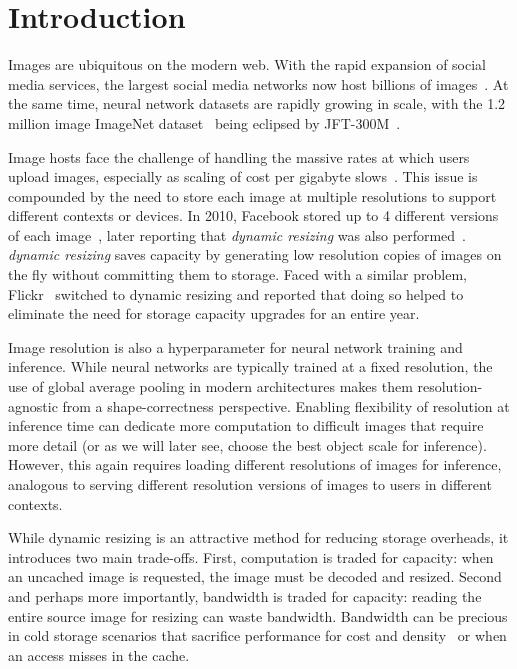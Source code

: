 \section{Introduction}
Images are ubiquitous on the modern web. 
With the rapid expansion of social media services, the largest social media networks now host billions of images~\cite{huang2013analysis}.
At the same time, neural network datasets are rapidly growing in scale, with the 1.2 million image ImageNet dataset~\cite{russakovsky2015imagenet} being eclipsed by JFT-300M~\cite{sun2017revisiting}.

Image hosts face the challenge of handling the massive rates at which users upload images, especially as scaling of cost per gigabyte slows~\cite{gupta-mascots14}. 
This issue is compounded by the need to store each image at multiple resolutions to support different contexts or devices. 
In 2010, Facebook stored up to 4 different versions of each image~\cite{beaver2010finding}, later reporting that \emph{dynamic resizing} was also performed~\cite{huang2013analysis}.
\emph{dynamic resizing} saves capacity by generating low resolution copies of images on the fly without committing them to storage.
Faced with a similar problem, Flickr~\cite{flickr} switched to dynamic resizing and reported that doing so helped to eliminate the need for storage capacity upgrades for an entire year. 

Image resolution is also a hyperparameter for neural network training and inference.
While neural networks are typically trained at a fixed resolution, the use of global average pooling in modern architectures makes them resolution-agnostic from a shape-correctness perspective.
Enabling flexibility of resolution at inference time can dedicate more computation to difficult images that require more detail (or as we will later see, choose the best object scale for inference).
However, this again requires loading different resolutions of images for inference, analogous to serving different resolution versions of images to users in different contexts.

While dynamic resizing is an attractive method for reducing storage overheads, it introduces two main trade-offs. 
First, computation is traded for capacity: when an uncached image is requested, the image must be decoded and resized.
Second and perhaps more importantly, bandwidth is traded for capacity: reading the entire source image for resizing can waste bandwidth.
Bandwidth can be precious in cold storage scenarios that sacrifice performance for cost and density~\cite{black2016feeding} or when an access misses in the cache.

